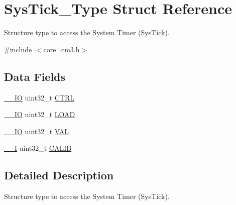 \hypertarget{structSysTick__Type}{\section{Sys\-Tick\-\_\-\-Type Struct Reference}
\label{structSysTick__Type}
}


Structure type to access the System Timer (Sys\-Tick).  




{\ttfamily \#include $<$core\-\_\-cm3.\-h$>$}

\subsection*{Data Fields}
\begin{DoxyCompactItemize}
\item 
\hyperlink{core__cm3_8h_aec43007d9998a0a0e01faede4133d6be}{\-\_\-\-\_\-\-I\-O} uint32\-\_\-t \hyperlink{structSysTick__Type_af2ad94ac83e5d40fc6e34884bc1bec5f}{C\-T\-R\-L}
\item 
\hyperlink{core__cm3_8h_aec43007d9998a0a0e01faede4133d6be}{\-\_\-\-\_\-\-I\-O} uint32\-\_\-t \hyperlink{structSysTick__Type_ae7bc9d3eac1147f3bba8d73a8395644f}{L\-O\-A\-D}
\item 
\hyperlink{core__cm3_8h_aec43007d9998a0a0e01faede4133d6be}{\-\_\-\-\_\-\-I\-O} uint32\-\_\-t \hyperlink{structSysTick__Type_a0997ff20f11817f8246e8f0edac6f4e4}{V\-A\-L}
\item 
\hyperlink{core__cm3_8h_af63697ed9952cc71e1225efe205f6cd3}{\-\_\-\-\_\-\-I} uint32\-\_\-t \hyperlink{structSysTick__Type_a9c9eda0ea6f6a7c904d2d75a6963e238}{C\-A\-L\-I\-B}
\end{DoxyCompactItemize}


\subsection{Detailed Description}
Structure type to access the System Timer (Sys\-Tick). 

